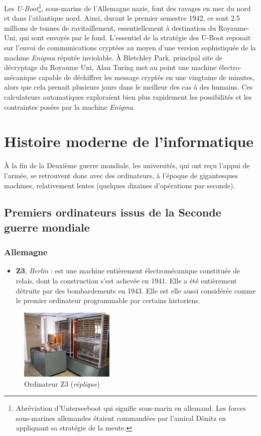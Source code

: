 \documentclass[a4paper,11pt]{book}
\begin{document}
Les \textit{U-Boot}\footnote{Abréviation d'Unterseeboot qui signifie sous-marin en allemand. Les forces sous-marines allemandes étaient commandées par l'amiral Dönitz en appliquant sa stratégie de la meute.}, sous-marins de l'Allemagne nazie, font des ravages en mer du nord et dans l'atlantique nord. Ainsi, durant le premier semestre 1942, ce sont 2.5 millions de tonnes de ravitaillement, essentiellement à destination du Royaume-Uni, qui sont envoyés par le fond. L'essentiel de la stratégie des U-Boot reposait sur l'envoi de communications cryptées au moyen d'une version sophistiquée de la machine \textit{Enigma} réputée inviolable.
À Bletchley Park, principal site de décryptage du Royaume Uni, Alan Turing met au point une machine électro-mécanique capable de déchiffrer les message cryptés en une vingtaine de minutes, alors que cela  prenait plusieurs jours dans le meilleur des cas à des humains. Ces calculateurs automatiques exploraient bien plus rapidement les possibilités et les contraintes posées par la machine \textit{Enigma}.

\section{Histoire moderne de l'informatique}
À la fin de la Deuxième guerre mondiale, les universités, qui ont reçu l'appui de l'armée, se retrouvent donc avec des ordinateurs, à l'époque de gigantesques machines, relativement lentes (quelques dizaines d'opérations par seconde).
\subsection{Premiers ordinateurs issus de la Seconde guerre mondiale}
\subsubsection{Allemagne}
\begin{itemize}
    \item \textbf{Z3}, \textit{Berlin} : est une machine entièrement électromécanique constituée de relais, dont la construction s'est achevée en 1941. Elle a été entièrement détruite par des bombardements en 1943. Elle est elle aussi considérée comme le premier ordinateur programmable par certains historiens. 
\end{itemize}

\begin{figure} 
    \centering
    \includegraphics[width=0.4\textwidth]{media/machines/Z3_Deutsches_Museum.jpeg}
    \caption{Ordinateur Z3 (\textit{réplique})}
\end{figure}
\end{document}
